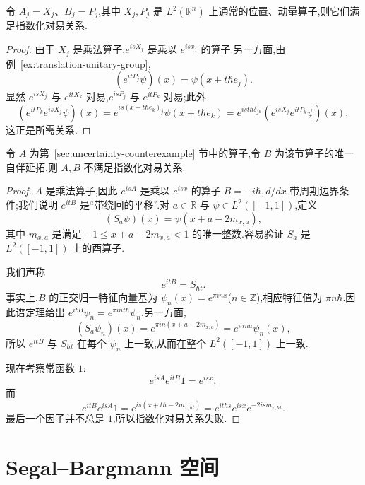 \begin{example}[通常的位置与动量算子]\label{ex:stone-usual-position-momentum}
令 $A_j=X_j$、$B_j=P_j$,其中 $X_j,P_j$ 是 $L^2(\mathbb R^n)$ 上通常的位置、动量算子,则它们满足指数化对易关系.
\end{example}

\begin{proof}
由于 $X_j$ 是乘法算子,$e^{isX_j}$ 是乘以 $e^{isx_j}$ 的算子.另一方面,由例~\ref{ex:translation-unitary-group},
\[
(e^{itP_j}\psi)(x)=\psi(x+t\hbar e_j).
\]
显然 $e^{isX_j}$ 与 $e^{itX_k}$ 对易,$e^{isP_j}$ 与 $e^{itP_k}$ 对易;此外
\[
(e^{itP_k}e^{isX_j}\psi)(x)
=e^{is(x+t\hbar e_k)_j}\psi(x+t\hbar e_k)
=e^{ist\hbar\delta_{jk}}(e^{isX_j}e^{itP_k}\psi)(x),
\]
这正是所需关系.
\end{proof}

\begin{example}[周期边界条件下的反例]\label{ex:stone-wraparound-counterexample}
令 $A$ 为第~\ref{sec:uncertainty-counterexample} 节中的算子,令 $B$ 为该节算子的唯一自伴延拓.则 $A,B$ 不满足指数化对易关系.
\end{example}

\begin{proof}
$A$ 是乘法算子,因此 $e^{isA}$ 是乘以 $e^{isx}$ 的算子.$B=-i\hbar,d/dx$ 带周期边界条件;我们说明 $e^{itB}$ 是“带绕回的平移”.对 $a\in\mathbb R$ 与 $\psi\in L^2([-1,1])$,定义
\[
(S_a\psi)(x)=\psi(x+a-2m_{x,a}),
\]
其中 $m_{x,a}$ 是满足 $-1\leq x+a-2m_{x,a}<1$ 的唯一整数.容易验证 $S_a$ 是 $L^2([-1,1])$ 上的酉算子.

我们声称
\[
e^{itB}=S_{\hbar t}.
\label{eq:stone-wraparound}
\]
事实上,$B$ 的正交归一特征向量基为 $\psi_n(x)=e^{\pi i n x}$($n\in\mathbb Z$),相应特征值为 $\pi n\hbar$.因此谱定理给出 $e^{itB}\psi_n=e^{\pi int\hbar}\psi_n$.另一方面,
\[
(S_a\psi_n)(x)=e^{\pi in(x+a-2m_{x,a})}
=e^{\pi ina}\psi_n(x),
\]
所以 $e^{itB}$ 与 $S_{\hbar t}$ 在每个 $\psi_n$ 上一致,从而在整个 $L^2([-1,1])$ 上一致.

现在考察常函数 $1$:
\[
e^{isA}e^{itB}1=e^{isx},
\]
而
\[
e^{itB}e^{isA}1=e^{is(x+t\hbar-2m_{x,\hbar t})}
=e^{it\hbar s}e^{isx}e^{-2ism_{x,\hbar t}}.
\]
最后一个因子并不总是 $1$,所以指数化对易关系失败.
\end{proof}

\ChapterFourteenTheorem

\section{Segal--Bargmann 空间}
\label{sec:segal-bargmann}

